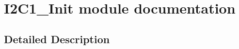 \hypertarget{group___i2_c1___init__module}{}\section{I2\+C1\+\_\+\+Init module documentation}
\label{group___i2_c1___init__module}


\subsection{Detailed Description}
